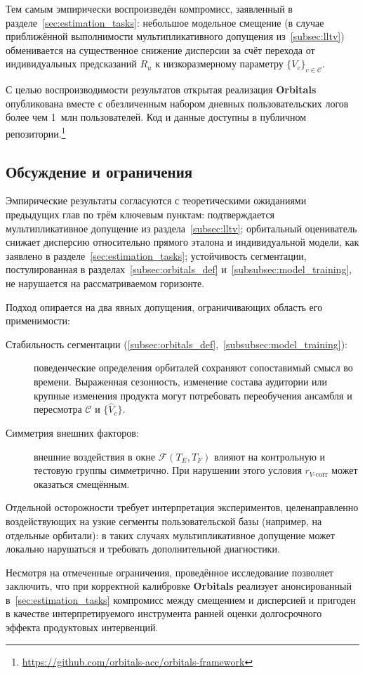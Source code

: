 Тем самым эмпирически воспроизведён компромисс, заявленный в
разделе~\ref{sec:estimation_tasks}: небольшое модельное смещение
(в случае приближённой выполнимости мультипликативного допущения
из~\ref{subsec:lltv}) обменивается на существенное снижение дисперсии
за счёт перехода от индивидуальных предсказаний $R_u$ к
низкоразмерному параметру $\{V_c\}_{c\in\mathcal{C}}$.

С целью воспроизводимости результатов открытая реализация
\textbf{Orbitals} опубликована вместе с обезличенным набором дневных
пользовательских логов более чем 1~млн пользователей. Код и данные
доступны в публичном
репозитории.\footnote{\href{https://github.com/orbitals-acc/orbitals-framework}{https://github.com/orbitals-acc/orbitals-framework}}


\subsection{Обсуждение и ограничения}
\label{subsec:limitations}

Эмпирические результаты согласуются с теоретическими ожиданиями
предыдущих глав по трём ключевым пунктам: подтверждается
мультипликативное допущение из раздела~\ref{subsec:lltv};
орбитальный оцениватель снижает дисперсию относительно прямого
эталона и индивидуальной модели, как заявлено в
разделе~\ref{sec:estimation_tasks}; устойчивость сегментации,
постулированная в разделах~\ref{subsec:orbitals_def}
и~\ref{subsubsec:model_training}, не нарушается на рассматриваемом
горизонте.

Подход опирается на два явных допущения, ограничивающих область его
применимости:
\begin{description}
    \item[Стабильность сегментации
          (\ref{subsec:orbitals_def},~\ref{subsubsec:model_training}):]
          поведенческие определения орбиталей сохраняют сопоставимый
          смысл во времени. Выраженная сезонность, изменение состава
          аудитории или крупные изменения продукта могут потребовать
          переобучения ансамбля и пересмотра $\mathcal{C}$ и
          $\{\hat{V}_c\}$.
    \item[Симметрия внешних факторов:] внешние воздействия в окне
          $\mathcal{F}(T_E, T_F)$ влияют на контрольную и тестовую
          группы симметрично. При нарушении этого условия
          $r_{V\text{-corr}}$ может оказаться смещённым.
\end{description}

Отдельной осторожности требует интерпретация экспериментов,
целенаправленно воздействующих на узкие сегменты пользовательской
базы (например, на отдельные орбитали): в таких случаях
мультипликативное допущение может локально нарушаться и требовать
дополнительной диагностики.

Несмотря на отмеченные ограничения, проведённое исследование позволяет
заключить, что при корректной калибровке \textbf{Orbitals} реализует
анонсированный в~\ref{sec:estimation_tasks} компромисс между
смещением и дисперсией и пригоден в качестве интерпретируемого
инструмента ранней оценки долгосрочного эффекта продуктовых
интервенций.